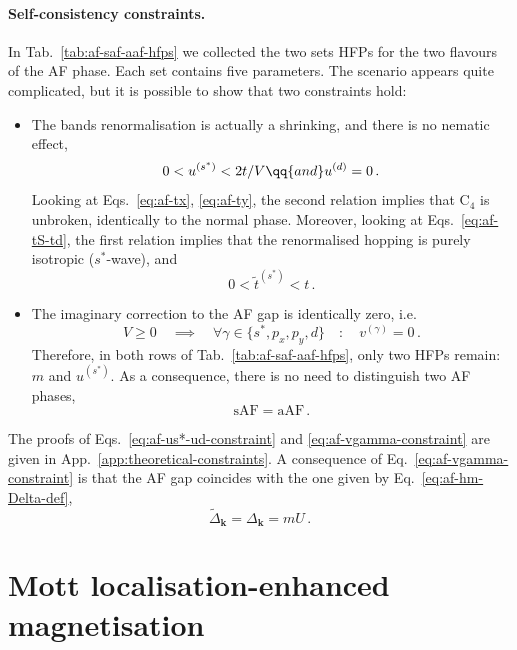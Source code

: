 \paragraph{Self-consistency constraints.}

In Tab.~\ref{tab:af-saf-aaf-hfps} we collected the two sets HFPs for the two flavours of the AF phase. Each set contains five parameters. The scenario appears quite complicated, but it is possible to show that two constraints hold:
\begin{itemize}
	\item The bands renormalisation is actually a shrinking, and there is no nematic effect,
	\begin{equation}\label{eq:af-us*-ud-constraint}
		0 < u^{(s^*)} < 2t/V
		\qq{and}
		u^{(d)} = 0 \, .
	\end{equation}
	Looking at Eqs.~\eqref{eq:af-tx}, \eqref{eq:af-ty}, the second relation implies that $\mathrm{C}_4$ is unbroken, identically to the normal phase. Moreover, looking at Eqs.~\eqref{eq:af-tS-td}, the first relation implies that the renormalised hopping is purely isotropic ($s^*$-wave), and 
	\[
		0 < \tilde{t}^{(s^*)} < t \, .
	\]
	\item The imaginary correction to the AF gap is identically zero, i.e.
	\begin{equation}\label{eq:af-vgamma-constraint}
		V \ge 0
		\quad\implies\quad
		\forall \gamma \in \lbrace s^*, p_x, p_y, d \rbrace
		\quad\colon\quad
		v^{(\gamma)} = 0 \, .
	\end{equation}
	Therefore, in both rows of Tab.~\ref{tab:af-saf-aaf-hfps}, only two HFPs remain: $m$ and $u^{(s^*)}$. As a consequence, there is no need to distinguish two AF phases,
	\[
		\mathrm{sAF} = \mathrm{aAF} \, .
	\]
\end{itemize}
The proofs of Eqs.~\eqref{eq:af-us*-ud-constraint} and \eqref{eq:af-vgamma-constraint} are given in App.~\ref{app:theoretical-constraints}. A consequence of Eq.~\eqref{eq:af-vgamma-constraint} is that the AF gap coincides with the one given by Eq.~\eqref{eq:af-hm-Delta-def},
\begin{equation}\label{eq:af-~gap=gap}
	\tilde{\Delta}_\mathbf{k} = \Delta_\mathbf{k} = mU \, .
\end{equation}

\section{Mott localisation-enhanced magnetisation}\label{sec:af-mott}

